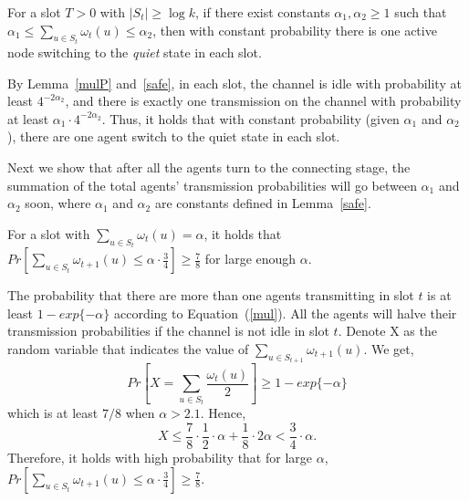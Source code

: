 \begin{lemma}
    \label{safe}
    For a slot $T>0$ with $|S_t| \ge \log k$, if 
    there exist constants $\alpha_1, \alpha_2 \ge 1$ such that
    $\alpha_1 \leq \sum_{u\in S_t}{\omega}_t(u) \leq \alpha_2$, then with constant probability 
    there is one active node switching to the \emph{quiet} state
    in each slot. 
\end{lemma}
\begin{IEEEproof}
    By Lemma~\ref{mulP} and~\ref{safe}, in each slot, the channel is idle with probability at least 
    $4^{-2\alpha_2}$, and there is exactly one transmission on the channel
    with probability at least $\alpha_1\cdot 4^{-2\alpha_2}$. Thus, 
    it holds that with constant probability (given $\alpha_1$ and $\alpha_2$),
    there are one agent switch to the quiet state in each slot.
\end{IEEEproof}

Next we show that after all the agents turn to the connecting stage, 
the summation of the total agents' transmission probabilities will go
between $\alpha_1$ and $\alpha_2$ soon, where $\alpha_1$ and $\alpha_2$
are constants defined in Lemma~\ref{safe}.
\begin{lemma}
    \label{lemma7}
    For a slot with ${\sum}_{u\in S_t}\omega_t(u)=\alpha$, it holds that
    $Pr[{\sum}_{u\in S_t}\omega_{t+1}(u) \leq \alpha\cdot\frac{3}{4}] 
    \geq \frac{7}{8}$
    for large enough $\alpha$.
\end{lemma}
\begin{IEEEproof}
    The probability that there are more than one agents transmitting in slot 
    $t$ is at least $1-exp\{-\alpha\}$ according to Equation~(\ref{mul}).
    All the agents will halve their transmission probabilities if the channel is 
    not idle in slot $t$. Denote X as the random variable that indicates the value of 
    ${\sum}_{u\in S_{t+1}}\omega_{t+1}(u)$. We get,
    \begin{equation*}
        Pr[X ={\sum}_{u\in S_t}\frac{\omega_t(u)}{2}] 
        \geq 1 - exp\{-\alpha\}
    \end{equation*}
    which is at least $7/8$ when $\alpha > 2.1$. Hence,
    \begin{equation*}
        X \leq \frac{7}{8}\cdot\frac{1}{2}\cdot\alpha + 
        \frac{1}{8}\cdot 2\alpha 
        < \frac{3}{4}\cdot\alpha.
    \end{equation*}
    Therefore, it holds with high probability that for large $\alpha$, $Pr[{\sum}_{u\in S_t}\omega_{t+1}(u) 
    \leq \alpha\cdot\frac{3}{4}] \geq \frac{7}{8}$.
\end{IEEEproof}

